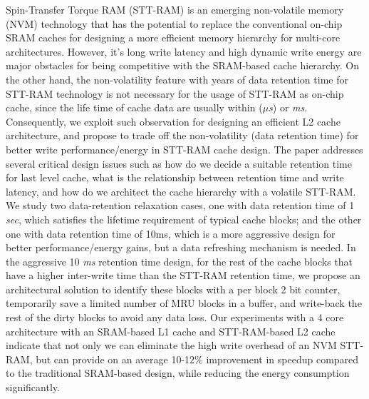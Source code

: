 \singlespacing

Spin-Transfer Torque RAM (STT-RAM) is an emerging non-volatile memory (NVM)
technology that has the potential to replace the conventional
on-chip SRAM caches for designing a more efficient memory hierarchy for
multi-core architectures.
However, it's long write latency and high dynamic
write energy are major obstacles for being competitive with the SRAM-based cache hierarchy.
On the other hand, the non-volatility feature with years of data retention time for STT-RAM technology is not necessary for the usage of STT-RAM as on-chip cache, since the life time of cache data are usually within ({\it $\mu$s}) or {\it ms}. Consequently,  we exploit such observation for designing an efficient L2 cache
architecture, and propose to trade off the non-volatility (data retention time)
for better write performance/energy in STT-RAM cache design. The paper addresses several critical design issues such as how do we decide a suitable retention time for last level cache,
what is the relationship between retention time and write latency,
and how do we architect the cache hierarchy with a volatile STT-RAM.
We study two
data-retention relaxation cases, one with data retention time of 1 {\it sec}, which satisfies the lifetime requirement of typical cache blocks; and the other one with data retention time of 10ms, which is a more aggressive design for better performance/energy gains, but a data refreshing mechanism is needed.
In the aggressive 10 {\it ms} retention time design, for the rest of the cache blocks that have a higher inter-write
time than the STT-RAM retention time, we propose an architectural solution to identify these blocks
with a per block 2 bit counter, temporarily save a limited number of MRU blocks in a buffer,
and write-back the rest of the dirty blocks to avoid any data loss.
Our experiments with a 4 core architecture with an SRAM-based L1 cache and STT-RAM-based L2 cache
indicate that not only we can eliminate the high write overhead of an NVM STT-RAM, but can provide
on an average 10-12\% improvement in speedup compared to the traditional SRAM-based
design, while reducing the energy consumption significantly.

